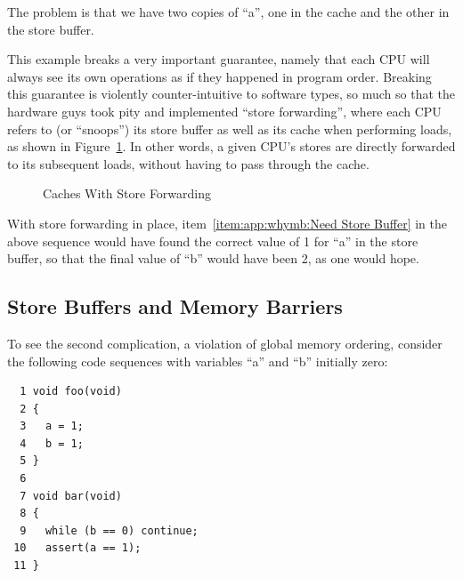 The problem is that we have two copies of ``a'', one in the cache and
the other in the store buffer.

This example breaks a very important guarantee, namely that each CPU
will always see its own operations as if they happened in program order.
Breaking this guarantee is violently counter-intuitive to software types,
so much so
that the hardware guys took pity and implemented ``store forwarding'',
where each CPU refers to (or ``snoops'') its store buffer as well
as its cache when performing loads, as shown in
Figure~\ref{fig:app:whymb:Caches With Store Forwarding}.
In other words, a given CPU's stores are directly forwarded to its
subsequent loads, without having to pass through the cache.

\begin{figure}[htb]
\begin{center}
\end{center}
\caption{Caches With Store Forwarding}
\label{fig:app:whymb:Caches With Store Forwarding}
\end{figure}

With store forwarding in place, item~\ref{item:app:whymb:Need Store Buffer}
in the above sequence would have found the correct value of 1 for ``a'' in
the store buffer, so that the final value of ``b'' would have been 2,
as one would hope.

\subsection{Store Buffers and Memory Barriers}
\label{sec:app:whymb:Store Buffers and Memory Barriers}

To see the second complication, a violation of global memory ordering,
consider the following code sequences
with variables ``a'' and ``b'' initially zero:

\vspace{5pt}
\begin{minipage}[t]{\columnwidth}
\small
\begin{verbatim}
  1 void foo(void)
  2 {
  3   a = 1;
  4   b = 1;
  5 }
  6
  7 void bar(void)
  8 {
  9   while (b == 0) continue;
 10   assert(a == 1);
 11 }
\end{verbatim}
\end{minipage}
\vspace{5pt}

